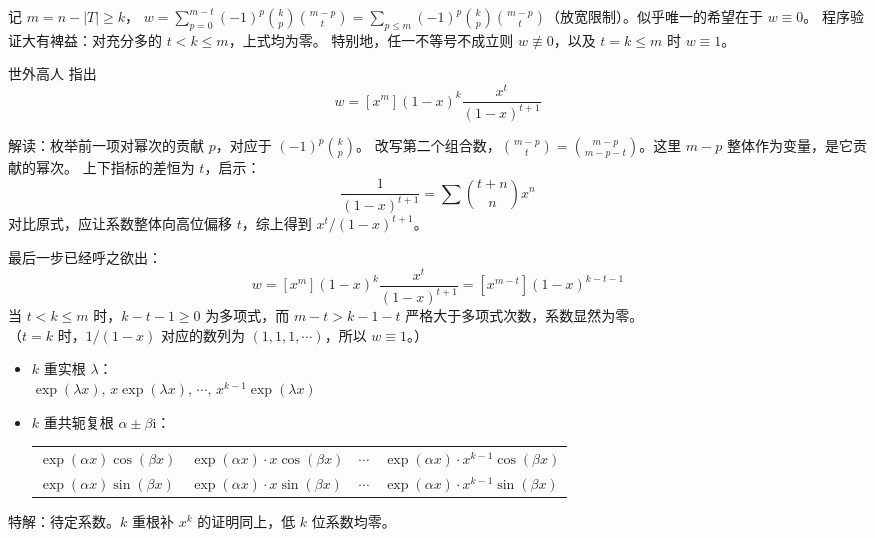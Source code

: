 \documentclass[12pt, a4paper, UTF8, openany]{ctexbook}
\newcommand{\imunit}{\mathrm{i}}%
\begin{document}
        记 $m = n - |T| \geqslant k$，
        $w = \sum\limits_{p = 0}^{m - t} (-1)^p \binom{k}{p}\binom{m - p}{t} 
        = \sum\limits_{p \leqslant m} (-1)^p \binom{k}{p}\binom{m - p}{t}$（放宽限制）。似乎唯一的希望在于 $w \equiv 0$。
        程序验证大有裨益：对充分多的 $t < k \leqslant m$，上式均为零。
        特别地，任一不等号不成立则 $w \not\equiv 0$，以及 $t = k \leqslant m$ 时 $w \equiv 1$。

        世外高人 {}{} 指出
        $$w = [x^m](1 - x)^k\frac{x^t}{(1 - x)^{t + 1}}$$

        解读：枚举前一项对幂次的贡献 $p$，对应于 $(-1)^p\binom{k}{p}$。
        改写第二个组合数，$\binom{m - p}{t} = \binom{m - p}{m - p - t}$。这里 $m - p$ 整体作为变量，是它贡献的幂次。
        上下指标的差恒为 $t$，启示：
        $$\frac{1}{(1 - x)^{t + 1}} = \sum \binom{t + n}{n} x^n$$
        对比原式，应让系数整体向高位偏移 $t$，综上得到 $x^t / (1 - x)^{t + 1}$。

        最后一步已经呼之欲出：
        $$w = [x^m](1 - x)^k\frac{x^t}{(1 - x)^{t + 1}} = [x^{m - t}](1 - x)^{k - t - 1}$$
        当 $t < k \leqslant m$ 时，$k - t - 1 \geqslant 0$ 为多项式，而 $m - t > k - 1 - t$ 严格大于多项式次数，系数显然为零。\\
        （$t = k$ 时，$1 / (1 - x)$ 对应的数列为 $(1, 1, 1, \cdots)$，所以 $w \equiv 1$。）

        \begin{itemize}
            \item $k$ 重实根 $\lambda$：\\
                $\exp(\lambda x), \, x\exp(\lambda x), \, \cdots, \, x^{k - 1}\exp(\lambda x)$
            \item $k$ 重共轭复根 $\alpha \pm \beta\imunit$：
                \begin{longtable}[h]{*{2}{w{c}{4cm}} w{c}{0.5cm} w{c}{4cm}}
                    $\exp(\alpha x)\cos(\beta x)$ & $\exp(\alpha x)\cdot x\cos(\beta x)$ 
                    & $\cdots$ & $\exp(\alpha x)\cdot x^{k - 1}\cos(\beta x)$ \\
                    $\exp(\alpha x)\sin(\beta x)$ & $\exp(\alpha x)\cdot x\sin(\beta x)$ 
                    & $\cdots$ & $\exp(\alpha x)\cdot x^{k - 1}\sin(\beta x)$
                \end{longtable}
        \end{itemize}

        特解：待定系数。$k$ 重根补 $x^k$ 的证明同上，低 $k$ 位系数均零。
\end{document}
